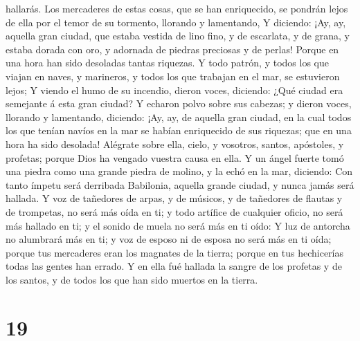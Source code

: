 hallarás.  Los mercaderes de estas cosas, que se han
enriquecido, se pondrán lejos de ella por el temor de su tormento,
llorando y lamentando,  Y diciendo: ¡Ay, ay, aquella gran
ciudad, que estaba vestida de lino fino, y de escarlata, y de grana, y
estaba dorada con oro, y adornada de piedras preciosas y de perlas!
 Porque en una hora han sido desoladas tantas riquezas. Y
todo patrón, y todos los que viajan en naves, y marineros, y todos los
que trabajan en el mar, se estuvieron lejos;  Y viendo el
humo de su incendio, dieron voces, diciendo: ¿Qué ciudad era semejante á
esta gran ciudad?  Y echaron polvo sobre sus cabezas; y
dieron voces, llorando y lamentando, diciendo: ¡Ay, ay, de aquella gran
ciudad, en la cual todos los que tenían navíos en la mar se habían
enriquecido de sus riquezas; que en una hora ha sido desolada!
 Alégrate sobre ella, cielo, y vosotros, santos, apóstoles,
y profetas; porque Dios ha vengado vuestra causa en ella. 
Y un ángel fuerte tomó una piedra como una grande piedra de molino, y la
echó en la mar, diciendo: Con tanto ímpetu será derribada Babilonia,
aquella grande ciudad, y nunca jamás será hallada.  Y voz
de tañedores de arpas, y de músicos, y de tañedores de flautas y de
trompetas, no será más oída en ti; y todo artífice de cualquier oficio,
no será más hallado en ti; y el sonido de muela no será más en ti oído:
 Y luz de antorcha no alumbrará más en ti; y voz de esposo
ni de esposa no será más en ti oída; porque tus mercaderes eran los
magnates de la tierra; porque en tus hechicerías todas las gentes han
errado.  Y en ella fué hallada la sangre de los profetas y
de los santos, y de todos los que han sido muertos en la tierra.

\hypertarget{section-18}{%
\section{19}\label{section-18}}

